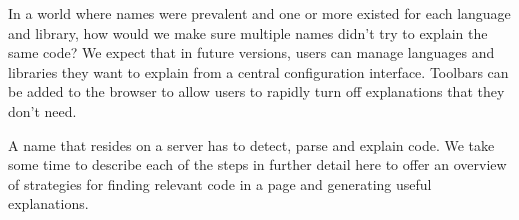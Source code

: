 \begin{figure}
\end{figure}

In a world where \glspl{name} were prevalent and one or more existed for each language and library, how would we make sure multiple \glspl{name} didn't try to explain the same code?
We expect that in future versions, users can manage languages and libraries they want to explain from a central configuration interface.
Toolbars can be added to the browser to allow users to rapidly turn off explanations that they don't need.

A \gls{name} that resides on a server has to detect, parse and explain code.
We take some time to describe each of the steps in further detail here to offer an overview of strategies for finding relevant code in a page and generating useful explanations.

